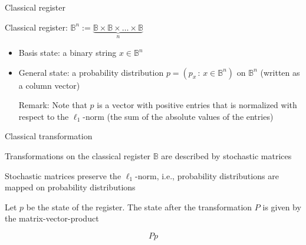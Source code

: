


\begin{frame}{Classical register}

Classical register: $\mathbb{B}^n := \underbrace{\mathbb{B} \times \mathbb{B} \times \ldots \times \mathbb{B}}_{n}$

\bigskip
\begin{itemize}
\item Basis state: a binary string $x\in\mathbb{B}^n$

\bigskip
\item General state: a probability distribution $p=(p_x \,:\, x\in\mathbb{B}^n)$ on $\mathbb{B}^n$ (written as a column vector)

\bigskip

\bigskip
Remark: Note that $p$ is a vector with positive entries that is normalized with respect to the $\ell_1$-norm (the sum of the absolute values of the entries)
\end{itemize}

\end{frame}




\begin{frame}{Classical transformation}

Transformations on the classical register $\mathbb{B}$ are described by stochastic matrices

\bigskip
Stochastic matrices preserve the $\ell_1$-norm, i.e., probability distributions are mapped on probability distributions

\bigskip
Let $p$ be the state of the register.  The state after the transformation $P$ is given by the matrix-vector-product 

\[
P p
\]

\end{frame}




